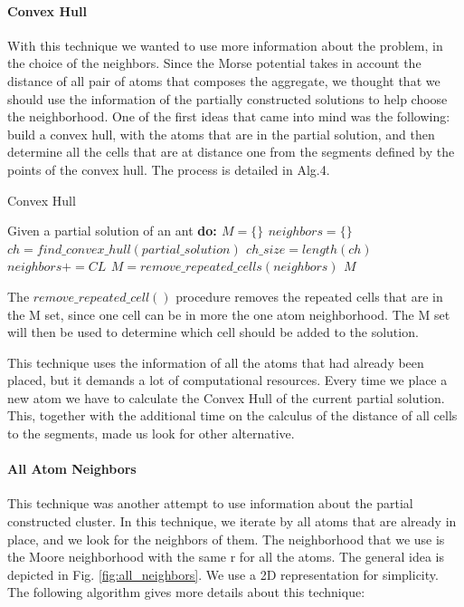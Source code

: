 			\paragraph*{Convex Hull}
			With this technique we wanted to use more information about the problem, in the choice of the neighbors. Since the Morse potential takes in account the distance of all pair of atoms that composes the aggregate, we thought that we should use the information of the partially constructed solutions to help choose the neighborhood. One of the first ideas that came into mind was the following: build a convex hull, with the atoms that are in the partial solution, and then determine all the cells that are at distance one from the segments defined by the points of the convex hull. The process is detailed in Alg.4.
			\begin{algorithm}
				\caption{Convex Hull}
				\label{alg:convex_hull}
				\begin{algorithmic}
				\STATE Given a partial solution of an ant \bf{do}:
				\STATE $M = \{\}$
				\STATE $neighbors = \{\}$
				\STATE $ch = find\_convex\_hull(partial\_solution)$
				\STATE $ch\_size = length(ch)$
							\STATE $neighbors += CL$
						\ENDIF
					\ENDFOR
				\ENDFOR
				\STATE $M = remove\_repeated\_cells(neighbors)$
				\RETURN $M$
				\end{algorithmic}
			\end{algorithm}
			
			The $remove\_repeated\_cell()$ procedure removes the repeated cells that are in the M set, since one cell can be in more the one atom neighborhood.
			The M set will then be used to determine which cell should be added to the solution.

			This technique uses the information of all the atoms that had already been placed, but it demands a lot of computational resources. Every time we place a new atom we have to calculate the Convex Hull of the current partial solution. This, together with the additional time on the calculus of the distance of all cells to the segments, made us look for other alternative.
			
			\paragraph*{All Atom Neighbors}
			This technique was another attempt to use information about the partial constructed cluster.  In this technique, we iterate by all atoms that are already in place, and we look for the neighbors of them. The neighborhood that we use is the Moore neighborhood with the same r for all the atoms. The general idea is depicted in Fig. \ref{fig:all_neighbors}. We use a 2D representation for simplicity. The following algorithm gives more details about this technique:
		
